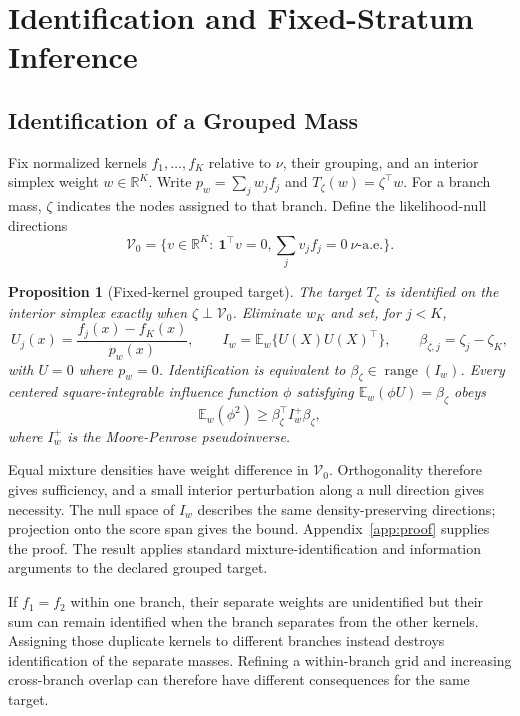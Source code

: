 \documentclass[10pt]{article}
\newcommand{\E}{\mathbb E}
\newcommand{\R}{\mathbb R}
\newtheorem{proposition}{Proposition}
\theoremstyle{definition}
\theoremstyle{plain}
\begin{document}
\section{Identification and Fixed-Stratum Inference}
\label{sec:identification}
\subsection{Identification of a Grouped Mass}
Fix normalized kernels $f_1,\ldots,f_K$ relative to $\nu$, their grouping,
and an interior simplex weight $w\in\R^K$. Write $p_w=\sum_jw_jf_j$ and
$T_\zeta(w)=\zeta^\top w$. For a branch mass, $\zeta$ indicates the nodes
assigned to that branch. Define the likelihood-null directions
\begin{equation}
 \mathcal V_0=\{v\in\R^K:\ \boldsymbol 1^\top v=0,
                  \textstyle\sum_jv_jf_j=0\ \nu\text{-a.e.}\}.
 \label{eq:nullspace}
\end{equation}
\begin{proposition}[Fixed-kernel grouped target]
\label{prop:identification}
The target $T_\zeta$ is identified on the interior simplex exactly when
$\zeta\perp\mathcal V_0$. Eliminate $w_K$ and set, for $j<K$,
\begin{equation}
 U_j(x)=\frac{f_j(x)-f_K(x)}{p_w(x)},\qquad
 I_w=\E_w\{U(X)U(X)^\top\},\qquad
 \beta_{\zeta,j}=\zeta_j-\zeta_K,
 \label{eq:information}
\end{equation}
with $U=0$ where $p_w=0$. Identification is equivalent to
$\beta_\zeta\in\operatorname{range}(I_w)$. Every centered square-integrable
influence function $\phi$ satisfying $\E_w(\phi U)=\beta_\zeta$ obeys
\begin{equation}
\E_w(\phi^2)\ge\beta_\zeta^\top I_w^+\beta_\zeta,
 \label{eq:bound}
\end{equation}
where $I_w^+$ is the Moore-Penrose pseudoinverse.
\end{proposition}

Equal mixture densities have weight difference in $\mathcal V_0$.
Orthogonality therefore gives sufficiency, and a small interior perturbation
along a null direction gives necessity. The null space of $I_w$ describes
the same density-preserving directions; projection onto the score span gives
the bound. Appendix~\ref{app:proof} supplies the proof. The result applies
standard mixture-identification and information arguments
\citep{mclachlan2000finite,vandervaart1998asymptotic} to the declared grouped
target.

If $f_1=f_2$ within one branch, their separate weights are unidentified but
their sum can remain identified when the branch separates from the other
kernels. Assigning those duplicate kernels to different branches instead
destroys identification of the separate masses. Refining a within-branch
grid and increasing cross-branch overlap can therefore have different
consequences for the same target.
\end{document}
